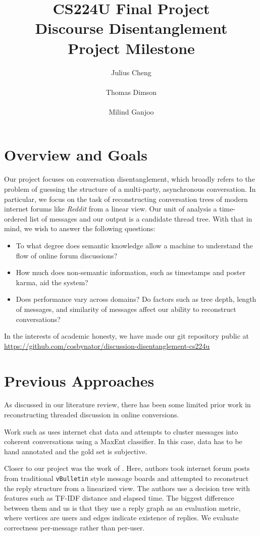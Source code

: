 \documentclass[10pt]{article}
\title{{\small CS224U Final Project} \\ Discourse Disentanglement \\{\small Project Milestone}}
\author{Julius Cheng \\
  \\\And
  Thomas Dimson  \\
  \\\And
  Milind Ganjoo \\
}
\date{}
\begin{document}
\maketitle

\section{Overview and Goals}
Our project focuses on conversation disentanglement, which broadly refers to
the problem of guessing the structure of a multi-party, asynchronous
conversation. In particular, we focus on the task of reconstructing conversation
trees of modern internet forums like \textit{Reddit} from a linear view. Our unit of 
analysis a time-ordered list of messages and our output is a candidate thread tree. 
With that in mind, we wish to answer the following questions:

\begin{itemize}
  \item To what degree does semantic knowledge allow a machine to understand the 
    flow of online forum discussions?
  \item How much does non-semantic information, such as timestamps and poster karma,
    aid the system?
  \item Does performance vary across domains? Do factors such as tree depth,
    length of messages, and similarity of messages affect our ability to
    reconstruct conversations? 
\end{itemize}

In the interests of academic honesty, we have made our git repository public at
\url{https://github.com/cosbynator/discussion-disentanglement-cs224u}

\section{Previous Approaches}
\label{sec:approaches}
As discussed in our literature review, there has been some limited prior 
work in reconstructing threaded discussion in online conversions. 

Work such as \cite{Elsner2008a} 
uses internet chat data and attempts to cluster messages into coherent 
conversations using a MaxEnt classifier. In this case, data has to be hand annotated and
the gold set is subjective.

Closer to our project was the work of \cite{Aumayr2011a}. Here, authors took
internet forum posts from traditional \texttt{vBulletin} style message boards
and attempted to reconstruct the reply structure from a linearized view. The authors
use a decision tree with features such as TF-IDF distance and elapsed time. The biggest
difference between them and us is that they use a reply graph as an evaluation metric,
where vertices are users and edges indicate existence of replies. We evaluate correctness
per-message rather than per-user.
\end{document}
